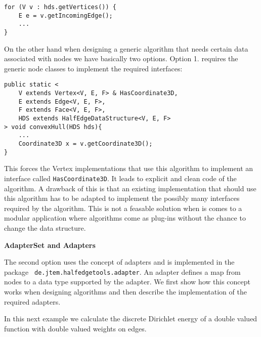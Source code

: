 \documentclass[Thesis.tex]{subfiles}
\begin{document}
\begin{lstlisting}
for (V v : hds.getVertices()) {
	E e = v.getIncomingEdge();
	...
}
\end{lstlisting}

On the other hand when designing a generic algorithm that needs certain data associated
with nodes we have basically two options. Option 1. requires the generic node classes to
implement the required interfaces:

\begin{lstlisting}
public static <
	V extends Vertex<V, E, F> & HasCoordinate3D,
	E extends Edge<V, E, F>,
	F extends Face<V, E, F>,
	HDS extends HalfEdgeDataStructure<V, E, F>
> void convexHull(HDS hds){
	...
	Coordinate3D x = v.getCoordinate3D();
}
\end{lstlisting}

This forces the Vertex implementations that use this algorithm to implement an interface
called {\tt HasCoordinate3D}. It leads to explicit and clean code of the algorithm. A drawback of this
is that an existing implementation that should use this algorithm has to be adapted to implement the 
possibly many interfaces required by the algorithm. 
This is not a feasable solution when is comes to a modular application where algorithms come as 
plug-ins without the chance to change the data structure.

{\bf AdapterSet and Adapters}

The second option uses the concept of adapters and is implemented in the package {\tt
de.jtem.\-halfedge\-tools.adapter}. An adapter defines a map from nodes to a data type supported 
by the adapter. We first show how this concept works when designing algorithms and then
describe the implementation of the required adapters. 

In this next example we calculate the discrete Dirichlet energy of a double valued function with 
double valued weights on edges. 


\end{document}
